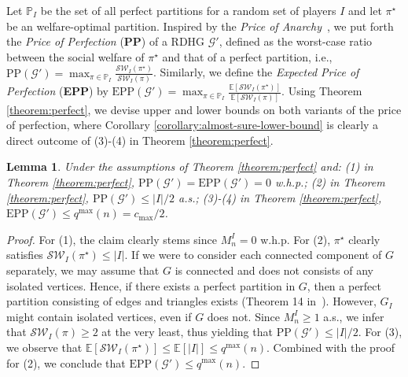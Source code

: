 \documentclass[letterpaper]{article} %
\newtheorem{lemma}{Lemma}
\begin{document}
Let $\mathbb{P}_I$ be the set of all perfect partitions for a random set of players $I$ and let $\pi^\star$ be an welfare-optimal partition. Inspired by the \textit{Price of Anarchy}~\cite{koutsoupias1999worst}, we put forth the \textit{Price of Perfection} (\textbf{PP}) of a RDHG $\mathcal{G}'$, defined as the worst-case ratio between the social welfare of $\pi^\star$ and that of a perfect partition, i.e., $\text{PP}(\mathcal{G}') = \max_{\pi \in \mathbb{P}_I} \frac{\mathcal{SW}_I(\pi^\star)}{\mathcal{SW}_I(\pi)}$. Similarly, we define the \textit{Expected Price of Perfection} (\textbf{EPP}) by $\text{EPP}(\mathcal{G}') = \max_{\pi \in \mathbb{P}_I} \frac{\mathbb{E}[\mathcal{SW}_I(\pi^\star)]}{\mathbb{E}[\mathcal{SW}_I(\pi)]}$. Using Theorem \ref{theorem:perfect}, we devise upper and lower bounds on both variants of the price of perfection, where Corollary \ref{corollary:almost-sure-lower-bound} is clearly a direct outcome of (3)-(4) in Theorem \ref{theorem:perfect}.
\begin{lemma}
\label{lemma:almost-sure-upper-bound}
Under the assumptions of Theorem \ref{theorem:perfect} and: (1) in Theorem \ref{theorem:perfect}, $\text{PP}(\mathcal{G}') = \text{EPP}(\mathcal{G}') = 0$ w.h.p.; (2) in Theorem \ref{theorem:perfect}, $\text{PP}(\mathcal{G}') \leq |I|/2$ a.s.; (3)-(4) in Theorem \ref{theorem:perfect}, $\text{EPP}(\mathcal{G}') \leq q^{\max}(n) = c_{\max}/2$.
\end{lemma}
\begin{proof}
For (1), the claim clearly stems since $M_n^I = 0$ w.h.p. For (2), $\pi^\star$ clearly satisfies $\mathcal{SW}_I(\pi^\star) \leq |I|$. If we were to consider each connected component of $G$ separately, we may assume that $G$ is connected and does not consists of any isolated vertices. Hence, if there exists a perfect partition in $G$, then a perfect partition consisting of edges and triangles exists (Theorem 14 in~\cite{peters2016complexity}). However, $G_I$ might contain isolated vertices, even if $G$ does not. Since $M_n^I \geq 1$ a.s., we infer that $\mathcal{SW}_I(\pi) \geq 2$ at the very least, thus yielding that $\text{PP}(\mathcal{G}') \leq |I|/2$. For (3), we observe that $\mathbb{E}[\mathcal{SW}_I(\pi^\star)] \leq \mathbb{E}[|I|] \leq q^{\max}(n)$. Combined with the proof for (2), we conclude that $\text{EPP}(\mathcal{G}') \leq q^{\max}(n)$.
\end{proof}
\end{document}
